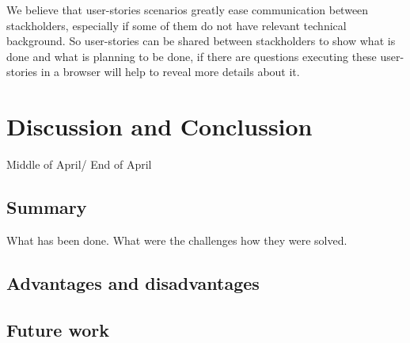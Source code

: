 \documentclass{article}
\begin{document}
We believe that user-stories scenarios greatly ease communication between stackholders, especially if some of them do not have relevant technical background. So user-stories can be shared between stackholders to show what is done and what is planning to be done, if there are questions executing these user-stories in a browser will help to reveal more details about it. 
   
   
   
    
 \section {Discussion and Conclussion}
 	Middle of April/ End of April
 	\subsection {Summary}
 	  What has been done. What were the challenges how they were solved.
 	\subsection {Advantages and disadvantages}
 	\subsection {Future work}
 	
\end{document}
